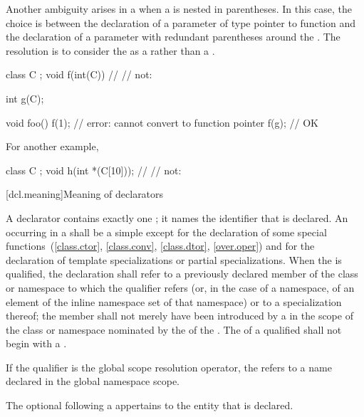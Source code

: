 \pnum
Another ambiguity arises in a
 when a
is nested in parentheses.
In this case, the choice is between the declaration of a parameter of type
pointer to function and the declaration of a parameter with redundant
parentheses around the
.
The resolution is to consider the
as a
rather than a
.
\begin{example}

\begin{codeblock}
class C { };
void f(int(C)) { }              // 
                                // not: 

int g(C);

void foo() {
  f(1);                         // error: cannot convert  to function pointer
  f(g);                         // OK
}
\end{codeblock}

For another example,

\begin{codeblock}
class C { };
void h(int *(C[10]));           // 
                                // not: 
\end{codeblock}
\end{example}

[dcl.meaning]{Meaning of declarators}%

\pnum
{}%
A declarator contains exactly one
;
it names the identifier that is declared.
An
occurring in
a
shall be a simple
except for the declaration of some special functions~(\ref{class.ctor},
\ref{class.conv}, \ref{class.dtor}, \ref{over.oper}) and
for the declaration of template specializations
or partial specializations.
When the
is qualified, the declaration shall refer to a previously declared member
of the class or namespace to which the qualifier refers (or,
in the case of a namespace,
of an element of the inline namespace
set of that namespace) or to a specialization thereof; the member
shall not merely have been introduced by a
in the scope of the class or namespace nominated by the
of the
.
The  of a qualified  shall not
begin with a .
\begin{note}
If the qualifier is the global
\tcode{::}
scope resolution operator, the
refers to a name declared in the global namespace scope.
\end{note}
The optional  following a  appertains to the entity that is declared.

